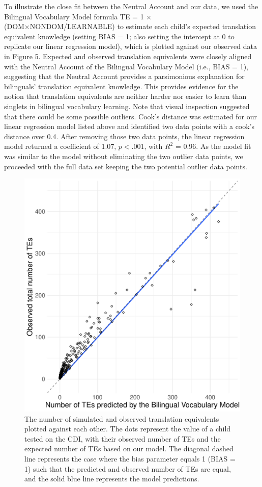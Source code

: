 \documentclass[
  english,
  ,man,floatsintext]{apa6}
\begin{document}
To illustrate the close fit between the Neutral Account and our data, we used the Bilingual Vocabulary Model formula TE = 1 × (DOM×NONDOM/LEARNABLE) to estimate each child's expected translation equivalent knowledge (setting BIAS = 1; also setting the intercept at 0 to replicate our linear regression model), which is plotted against our observed data in Figure 5. Expected and observed translation equivalents were closely aligned with the Neutral Account of the Bilingual Vocabulary Model (i.e., BIAS = 1), suggesting that the Neutral Account provides a parsimonious explanation for bilinguals' translation equivalent knowledge. This provides evidence for the notion that translation equivalents are neither harder nor easier to learn than singlets in bilingual vocabulary learning. Note that visual inspection suggested that there could be some possible outliers. Cook's distance was estimated for our linear regression model listed above and identified two data points with a cook's distance over 0.4. After removing those two data points, the linear regression model returned a coefficient of 1.07, \(p < .001\), with \(R^2\) = 0.96. As the model fit was similar to the model without eliminating the two outlier data points, we proceeded with the full data set keeping the two potential outlier data points.

\begin{figure}

{\centering \includegraphics[width=0.6\linewidth,height=0.6\textheight]{paper_TE_bilingual_vocabulary_model_files/figure-latex/fig5-1} 

}

\caption{The number of simulated and observed translation equivalents plotted against each other. The dots represent the value of a child tested on the CDI, with their observed number of TEs and the expected number of TEs based on our model. The diagonal dashed line represents the case where the bias parameter equals 1 (BIAS = 1) such that the predicted and observed number of TEs are equal, and the solid blue line represents the model predictions.}\label{fig:fig5}
\end{figure}
\end{document}
